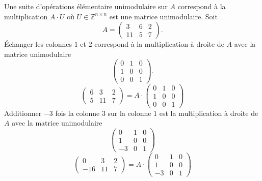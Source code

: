 \begin{example}
  \label{exe:27}
  Une suite d'opérations élémentaire unimodulaire sur $A$ correspond à la multiplication $A⋅U$ où $U ∈ℤ^{n ×n}$ est une matrice unimodulaire.
Soit 
  \begin{displaymath}
    A =
    \begin{pmatrix}
      3 & 6 & 2 \\
      11 & 5 & 7
    \end{pmatrix}. 
  \end{displaymath}
  Échanger les colonnes $1$ et $2$ correspond à la multiplication à droite de $A$ avec la matrice unimodulaire 
  \begin{displaymath}
    \begin{pmatrix}
    0& 1 & 0 \\
    1 & 0 & 0 \\
    0 & 0 & 1
      
    \end{pmatrix}.
  \end{displaymath}
  \begin{displaymath}
     \begin{pmatrix}
      6  & 3& 2 \\
       5 & 11 & 7
     \end{pmatrix} = A ⋅
     \begin{pmatrix}
       0& 1 & 0 \\
       1 & 0 & 0 \\
       0 & 0 & 1
     \end{pmatrix}
   \end{displaymath}
   Additionner $-3$ fois la colonne $3$ sur la colonne $1$ est la multiplication à droite de $A$ avec la matrice unimodulaire 
   \begin{displaymath}
     \begin{pmatrix}       
     0 & 1 & 0\\ 
     1 & 0 & 0 \\
     -3 & 0 & 1
   \end{pmatrix}
 \end{displaymath} 
   \begin{displaymath}
     \begin{pmatrix}
      0  & 3& 2 \\
      -16 & 11 & 7
    \end{pmatrix} = A ⋅  \begin{pmatrix}
      
     0 & 1 & 0\\
     1 & 0 & 0 \\ 
     -3 & 0 & 1
   \end{pmatrix}
 \end{displaymath}
\end{example}


